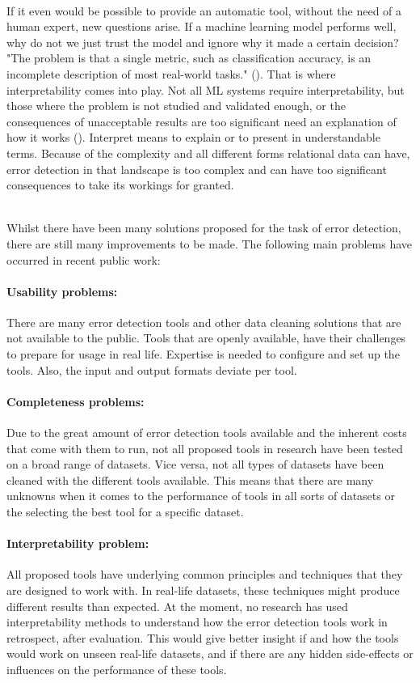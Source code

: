~\\If it even would be possible to provide an automatic tool, without the need of a human expert, new questions arise. 
If a machine learning model performs well, why do not we just trust the model and ignore why it made a certain decision? "The problem is that a single metric, such as classification accuracy, is an incomplete description of most real-world tasks." (\cite{Molnar2020-do}).
That is where interpretability comes into play. Not all ML systems require interpretability, but those where the problem is not studied and validated enough, or the consequences of unacceptable results are too significant need an explanation of how it works (\cite{Doshi-Velez2017-ec}). Interpret means to explain or to present in understandable terms. Because of the complexity and all different forms relational data can have, error detection in that landscape is too complex and can have too significant consequences to take its workings for granted. 

~\\Whilst there have been many solutions proposed for the task of error detection, there are still many improvements to be made. The following main problems have occurred in recent public work:

\paragraph{Usability problems:} There are many error detection tools and other data cleaning solutions that are not available to the public. Tools that are openly available, have their challenges to prepare for usage in real life. Expertise is needed to configure and set up the tools. Also, the input and output formats deviate per tool. 

\paragraph{Completeness problems:} Due to the great amount of error detection tools available and the inherent costs that come with them to run, not all proposed tools in research have been tested on a broad range of datasets. Vice versa, not all types of datasets have been cleaned with the different tools available. This means that there are many unknowns when it comes to the performance of tools in all sorts of datasets or the selecting the best tool for a specific dataset.

\paragraph{Interpretability problem:} All proposed tools have underlying common principles and techniques that they are designed to work with. In real-life datasets, these techniques might produce different results than expected. At the moment, no research has used interpretability methods to understand how the error detection tools work in retrospect, after evaluation. This would give better insight if and how the tools would work on unseen real-life datasets, and if there are any hidden side-effects or influences on the performance of these tools.
